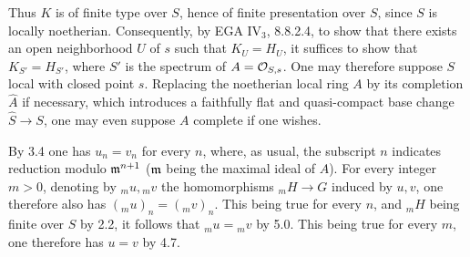 Thus $K$ is of finite type over $S$, hence of finite presentation over $S$, since $S$ is locally noetherian. Consequently, by EGA IV$_3$, 8.8.2.4, to show that there exists an open neighborhood $U$ of $s$ such that $K_U=H_U$, it suffices to show that $K_{S'}=H_{S'}$, where $S'$ is the spectrum of $A=\mathcal{O}_{S,s}$. One may therefore suppose $S$ local with closed point $s$. Replacing the noetherian local ring $A$ by its completion $\widehat A$ if necessary, which introduces a faithfully flat and quasi-compact base change $\widehat S\to S$, one may even suppose $A$ complete if one wishes.

By 3.4 one has $u_n=v_n$ for every $n$, where, as usual, the subscript $n$ indicates reduction modulo $\mathfrak m^{n+1}$ ($\mathfrak m$ being the maximal ideal of $A$). For every integer $m>0$, denoting by ${}_mu,{}_mv$ the homomorphisms ${}_mH\to G$ induced by $u,v$, one therefore also has $({}_mu)_n=({}_mv)_n$. This being true for every $n$, and ${}_mH$ being finite over $S$ by 2.2, it follows that ${}_mu={}_mv$ by 5.0. This being true for every $m$, one therefore has $u=v$ by 4.7.

